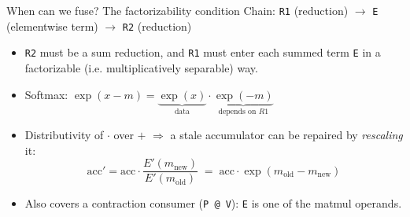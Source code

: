 \documentclass[10pt, aspectratio=169]{beamer}
\newcommand{\code}[1]{\texttt{\small #1}}
\begin{document}
\begin{frame}{When can we fuse? The factorizability condition}
  Chain: \quad \code{R1} (reduction) $\rightarrow$ \code{E} (elementwise term)
  $\rightarrow$ \code{R2} (reduction)
  \vspace{2mm}
  \begin{itemize}
    \item \code{R2} must be a \alert{sum} reduction, and \code{R1} must enter each
      summed term \code{E} in a \alert{factorizable (i.e. multiplicatively separable)} way.
    \item Softmax: \; $\exp(x - m) = \underbrace{\exp(x)}_{\text{data}} \cdot
      \underbrace{\exp(-m)}_{\text{depends on } R1}$
    \item Distributivity of $\cdot$ over $+$ $\Rightarrow$ a stale accumulator can
      be repaired by \emph{rescaling} it:
      \[
        \text{acc}' = \text{acc} \cdot
        \frac{E'(m_{\text{new}})}{E'(m_{\text{old}})}
        \;=\; \text{acc}\cdot \exp(m_{\text{old}} - m_{\text{new}})
      \]
    \item Also covers a contraction consumer (\code{P @ V}): \code{E} is one of the
      matmul operands.
  \end{itemize}
\end{frame}
\end{document}
